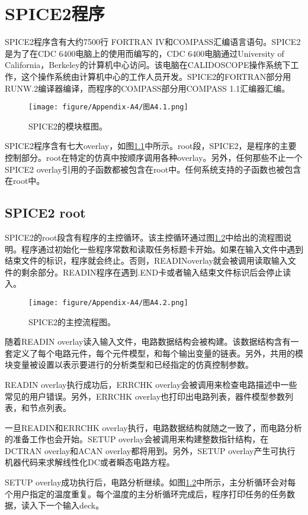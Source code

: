 \chapter{SPICE2程序}
\label{App:4}
SPICE2程序含有大约7500行 FORTRAN IV和COMPASS汇编语言语句。SPICE2是为了在CDC 6400电脑上的使用而编写的，CDC 6400电脑通过University of California，Berkeley的计算机中心访问。该电脑在CALIDOSCOPE操作系统下工作，这个操作系统由计算机中心的工作人员开发。SPICE2的FORTRAN部分用RUNW.2编译器编译，而程序的COMPASS部分用COMPASS 1.1汇编器汇编。
\begin{figure}[htbp]
\small
    \centering
    \texttt{[image: figure/Appendix-A4/图A4.1.png]}
    \caption{SPICE2的模块框图。}
    \label{图A4.1}
\end{figure}
SPICE2程序含有七大overlay，如图\ref{图A4.1}中所示。root段，SPICE2，是程序的主要控制部分。root在特定的仿真中按顺序调用各种overlay。另外，任何那些不止一个SPICE2 overlay引用的子函数都被包含在root中。任何系统支持的子函数也被包含在root中。

\section{SPICE2 root}
SPICE2的root段含有程序的主控循环。该主控循环通过图\ref{图A4.2}中给出的流程图说明。程序通过初始化一些程序常数和读取任务标题卡开始。如果在输入文件中遇到结束文件的标识，程序就会终止。否则，READINoverlay就会被调用读取输入文件的剩余部分。READIN程序在遇到.END卡或者输入结束文件标识后会停止读入。
\begin{figure}[htbp]
\small
    \centering
    \texttt{[image: figure/Appendix-A4/图A4.2.png]}
    \caption{SPICE2的主控流程图。}
    \label{图A4.2}
\end{figure}

随着READIN overlay读入输入文件，电路数据结构会被构建。该数据结构含有一套定义了每个电路元件，每个元件模型，和每个输出变量的链表。另外，共用的模块变量被设置以表示要进行的分析类型和已经指定的仿真控制参数。

READIN overlay执行成功后，ERRCHK overlay会被调用来检查电路描述中一些常见的用户错误。另外，ERRCHK overlay也打印出电路列表，器件模型参数列表，和节点列表。

一旦READIN和ERRCHK overlay执行，电路数据结构就随之一致了，而电路分析的准备工作也会开始。SETUP overlay会被调用来构建整数指针结构，在DCTRAN overlay和ACAN overlay都将用到。另外，SETUP overlay产生可执行机器代码来求解线性化DC或者瞬态电路方程。

SETUP overlay成功执行后，电路分析继续。如图\ref{图A4.2}中所示，主分析循环会对每个用户指定的温度重复。每个温度的主分析循环完成后，程序打印任务的任务数据，读入下一个输入deck。

